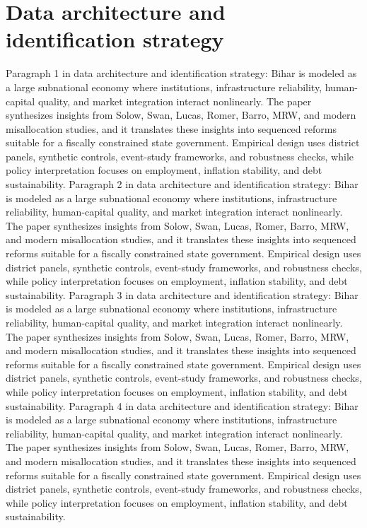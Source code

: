 \documentclass[preprint,12pt]{elsarticle}
\begin{document}
\section{Data architecture and identification strategy}
Paragraph 1 in data architecture and identification strategy: Bihar is modeled as a large subnational economy where institutions, infrastructure reliability, human-capital quality, and market integration interact nonlinearly. The paper synthesizes insights from Solow, Swan, Lucas, Romer, Barro, MRW, and modern misallocation studies, and it translates these insights into sequenced reforms suitable for a fiscally constrained state government. Empirical design uses district panels, synthetic controls, event-study frameworks, and robustness checks, while policy interpretation focuses on employment, inflation stability, and debt sustainability.
Paragraph 2 in data architecture and identification strategy: Bihar is modeled as a large subnational economy where institutions, infrastructure reliability, human-capital quality, and market integration interact nonlinearly. The paper synthesizes insights from Solow, Swan, Lucas, Romer, Barro, MRW, and modern misallocation studies, and it translates these insights into sequenced reforms suitable for a fiscally constrained state government. Empirical design uses district panels, synthetic controls, event-study frameworks, and robustness checks, while policy interpretation focuses on employment, inflation stability, and debt sustainability.
Paragraph 3 in data architecture and identification strategy: Bihar is modeled as a large subnational economy where institutions, infrastructure reliability, human-capital quality, and market integration interact nonlinearly. The paper synthesizes insights from Solow, Swan, Lucas, Romer, Barro, MRW, and modern misallocation studies, and it translates these insights into sequenced reforms suitable for a fiscally constrained state government. Empirical design uses district panels, synthetic controls, event-study frameworks, and robustness checks, while policy interpretation focuses on employment, inflation stability, and debt sustainability.
Paragraph 4 in data architecture and identification strategy: Bihar is modeled as a large subnational economy where institutions, infrastructure reliability, human-capital quality, and market integration interact nonlinearly. The paper synthesizes insights from Solow, Swan, Lucas, Romer, Barro, MRW, and modern misallocation studies, and it translates these insights into sequenced reforms suitable for a fiscally constrained state government. Empirical design uses district panels, synthetic controls, event-study frameworks, and robustness checks, while policy interpretation focuses on employment, inflation stability, and debt sustainability.
\end{document}
